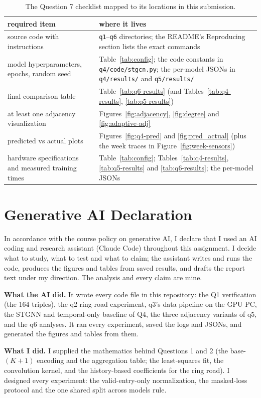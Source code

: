 \documentclass[11pt,letterpaper]{article}
\begin{document}
\begin{table}[htbp]
\centering
\small
\begin{tabular}{@{}p{2.2in}p{4.6in}@{}}
\toprule
\textbf{required item} & \textbf{where it lives} \\
\midrule
source code with instructions & \texttt{q1}--\texttt{q6} directories; the README's Reproducing section lists the exact commands \\
model hyperparameters, epochs, random seed & Table~\ref{tab:config}; the code constants in \texttt{q4/code/stgcn.py}; the per-model JSONs in \texttt{q4/results/} and \texttt{q5/results/} \\
final comparison table & Table~\ref{tab:q6-results} (and Tables~\ref{tab:q4-results}, \ref{tab:q5-results}) \\
at least one adjacency visualization & Figures~\ref{fig:adjacency}, \ref{fig:degree} and \ref{fig:adaptive-adj} \\
predicted vs actual plots & Figures~\ref{fig:q4-pred} and \ref{fig:pred_actual} (plus the week traces in Figure~\ref{fig:week-sensors}) \\
hardware specifications and measured training times & Table~\ref{tab:config}; Tables~\ref{tab:q4-results}, \ref{tab:q5-results} and \ref{tab:q6-results}; the per-model JSONs \\
\bottomrule
\end{tabular}
\caption{The Question 7 checklist mapped to its locations in this submission.}
\label{tab:q7checklist}
\end{table}

\newpage



\section*{Generative AI Declaration}

In accordance with the course policy on generative AI, I declare that I used an AI
coding and research assistant (Claude Code) throughout this assignment. I decide what to
study, what to test and what to claim; the assistant writes and runs the code, produces
the figures and tables from saved results, and drafts the report text under my direction.
The analysis and every claim are mine.

\textbf{What the AI did.} It wrote every code file in this repository: the Q1
verification (the 164 triples), the q2 ring-road experiment, q3's data pipeline on the
GPU PC, the STGNN and temporal-only baseline of Q4, the three adjacency variants of q5,
and the q6 analyses. It ran every experiment, saved the logs and JSONs, and generated the
figures and tables from them.

\textbf{What I did.} I supplied the mathematics behind Questions 1 and 2 (the
base-$(K+1)$ encoding and the aggregation table; the least-squares fit, the convolution
kernel, and the history-based coefficients for the ring road). I designed every experiment: the valid-entry-only
normalization, the masked-loss protocol and the one shared split across models rule.
\end{document}
